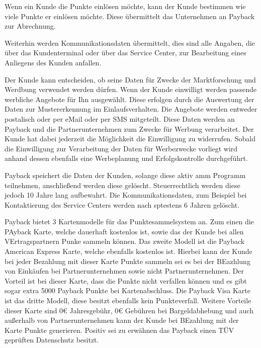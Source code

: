 Wenn ein Kunde die Punkte einlösen möchte, kann der Kunde bestimmen wie viele Punkte er einlösen möchte. Diese übermittelt das Unternehmen an Payback zur Abrechnung.

Weiterhin werden Kommunikationsdaten übermittelt, dies sind alle Angaben, die über das Kundenterminal oder über das Service Center, zur Bearbeitung eines Anliegens des Kunden anfallen. \newline

Der Kunde kann entscheiden, ob seine Daten für Zwecke der Marktforschung und Werdbung verwendet werden dürfen. Wenn der Kunde einwilligt werden passende werbliche Angebote für Ihn ausgewählt. Diese erfolgen durch die Auswertung der Daten zur Mustererkennung im Einlaufsverhalten.
Die Angebote werden entweder postalisch oder per eMail oder per SMS mitgeteilt.
Diese Daten werden an Payback und die Partnerunternehmen zum Zwecke für Werbung verarbeitet.
Der Kunde hat dabei jederzeit die Möglichkeit die Einwilligung zu widerrufen. Sobald die Einwilligung zur Verarbeitung der Daten für Werbezwecke vorliegt wird anhand dessen ebenfalls eine Werbeplanung und Erfolgskontrolle durchgeführt. \newline

Payback speichert die Daten der Kunden, solange diese aktiv amm Programm teilnehmen, anschließend werden diese gelöscht. Steuerrechtlich werden diese jedoch 10 Jahre lang aufbewahrt. Die Kommunikationsdaten, zum Beispiel bei Kontaktierung des Service Centers werden nach sptestens 6 Jahren gelöscht.
\label{Payback_Datenschutz} \newline

Payback bietet 3 Kartenmodelle für das Punktesammelsystem an. Zum einen die PAyback Karte, welche dauerhaft kostenlos ist, sowie das der Kunde bei allen VErtragspartnern Punke sammeln können. Das zweite Modell ist die Payback American Express Karte, welche ebenfalls kostenlos ist. Hierbei kann der Kunde bei jeder Bezahlung mit dieser Karte Punkte sammeln sei es bei der BEazhlung von Einkäufen bei Partnerunternehmen sowie nicht Partnerunternehmen. Der Vorteil ist bei dieser Karte, dass die Punkte nicht verfallen können und es gibt sogar extra 5000 Payback Punkte bei Kartenabschluss.
Die Payback Visa Karte ist das dritte Modell, diese besitzt ebenfalls kein Punkteverfall. Weitere Vorteile dieser Karte sind 0€ Jahresgebühr, 0€ Gebühren bei Bargeldabhebung und auch außerhalb von Partnerunternehmen kann der Kunde bei BEzahlung mit der Karte Punkte generieren.
Positiv sei zu erwähnen das Payback einen TÜV geprüften Datenschutz besitzt.
\label{Payback_Karten}